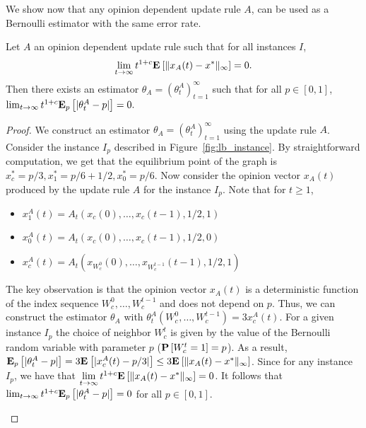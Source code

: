 We show now that any opinion dependent update rule $A$, can be used as a
Bernoulli estimator with the same error rate.
\begin{lemma}\label{l:reduction}
  Let $A$ an opinion dependent update rule such that for all instances $I$,
  \[\lim_{t \rightarrow \infty} t^{1+c}
  \bm{\mathrm{E}}_{} \left[ \| x_A(t)-x^* \|_{\infty} \right]=0.\]
  Then there exists an estimator $\theta_A=(\theta_t^A)_{t=1}^\infty$ such that for all
  $p \in [0,1]$,
  \(\lim_{t \rightarrow \infty}t^{1+c}\bm{\mathrm{E}}_{p} \left[ |\theta_t^A-p| \right]=0.\)
\end{lemma}
\begin{proof}
  We construct an estimator $\theta_A = (\theta^A_t)_{t=1}^\infty$
  using the update rule $A$. Consider the instance $I_p$ described in
  Figure~\ref{fig:lb_instance}.
  By straightforward computation, we get that the equilibrium point of
  the graph is $x_c^* = p/3, x_1^* = p/6+1/2, x_0^* = p/6$.
  Now consider the opinion vector $x_A(t)$ produced by the update
  rule $A$ for the instance $I_p$. Note that for $t \geq 1$,
  \begin{itemize}
   \item  $x_1^A(t)=A_t(x_c(0),\ldots,x_c(t-1),1/2,1)$
   \item  $x_0^A(t)=A_t(x_c(0),\ldots,x_c(t-1),1/2,0)$
   \item  $x_c^A(t)=A_t(x_{W_c^0}(0),\ldots,x_{W_c^{t-1}}(t-1),1/2,1)$
  \end{itemize}
  The key observation is that the opinion vector $x_A(t)$ is a deterministic function
  of the index sequence $W_c^0,\ldots,W_c^{t-1}$ and does not depend on $p$. Thus,
  we can construct the estimator $\theta_A$ with
  $\theta_t^A(W_c^0,\ldots,W_c^{t-1}) = 3x_c^A(t)$.
  For a given instance $I_p$ the choice of neighbor $W_c^t$ is given by the value of
  the Bernoulli random variable with parameter $p$ ($\bm{\mathrm{P}}\left[W_c^t=1\right]=p$). As a result,
  $\bm{\mathrm{E}}_{p} \left[ |\theta_t^A-p| \right]=
  3\bm{\mathrm{E}}_{} \left[ |x_c^A(t)-p/3| \right]\leq 3\bm{\mathrm{E}}_{} \left[ \| x_A(t)-x^* \|_{\infty} \right]$.
  Since for any instance $I_p$, we have that
  $\lim \limits_{t \rightarrow \infty} t^{1+c}\bm{\mathrm{E}}_{} \left[ \| x_A(t)-x^* \|_{\infty} \right]=0$.
  It follows that $\lim_{t \rightarrow \infty}t^{1+c}\bm{\mathrm{E}}_{p} \left[ |\theta_t^A -p| \right]=0$
  for all $p \in [0,1]$.
  \vspace{-5mm}
  \begin{figure}
    \centering
\end{figure}
\end{proof}
